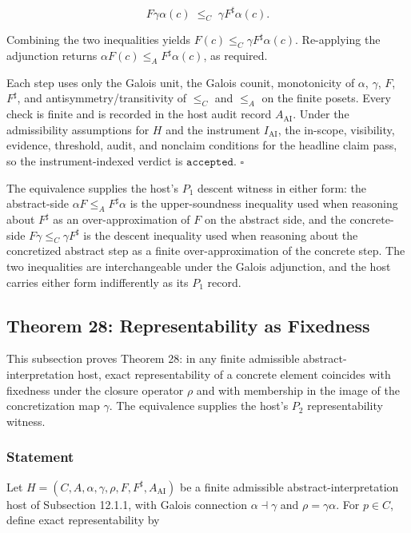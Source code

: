 \documentclass[11pt]{article}
\theoremstyle{definition}
\begin{document}
\[
F\gamma\alpha(c)\;\le_C\;\gamma F^{\sharp}\alpha(c).
\]

Combining the two inequalities yields \(F(c)\le_C\gamma F^{\sharp}\alpha(c)\). Re-applying the adjunction returns \(\alpha F(c)\le_A F^{\sharp}\alpha(c)\), as required.

Each step uses only the Galois unit, the Galois counit, monotonicity of \(\alpha\), \(\gamma\), \(F\), \(F^{\sharp}\), and antisymmetry/transitivity of \(\le_C\) and \(\le_A\) on the finite posets. Every check is finite and is recorded in the host audit record \(A_{\mathrm{AI}}\). Under the admissibility assumptions for \(H\) and the instrument \(I_{\mathrm{AI}}\), the in-scope, visibility, evidence, threshold, audit, and nonclaim conditions for the headline claim pass, so the instrument-indexed verdict is \(\texttt{accepted}\). \(\square\)

The equivalence supplies the host's \(P_1\) descent witness in either form: the abstract-side \(\alpha F\le_A F^{\sharp}\alpha\) is the upper-soundness inequality used when reasoning about \(F^{\sharp}\) as an over-approximation of \(F\) on the abstract side, and the concrete-side \(F\gamma\le_C\gamma F^{\sharp}\) is the descent inequality used when reasoning about the concretized abstract step as a finite over-approximation of the concrete step. The two inequalities are interchangeable under the Galois adjunction, and the host carries either form indifferently as its \(P_1\) record.

\subsection{Theorem 28: Representability as Fixedness}

This subsection proves Theorem 28: in any finite admissible abstract-interpretation host, exact representability of a concrete element coincides with fixedness under the closure operator \(\rho\) and with membership in the image of the concretization map \(\gamma\). The equivalence supplies the host's \(P_2\) representability witness.

\subsubsection{Statement}

Let \(H=(C,A,\alpha,\gamma,\rho,F,F^{\sharp},A_{\mathrm{AI}})\) be a finite admissible abstract-interpretation host of Subsection 12.1.1, with Galois connection \(\alpha\dashv\gamma\) and \(\rho=\gamma\alpha\). For \(p\in C\), define exact representability by
\end{document}
